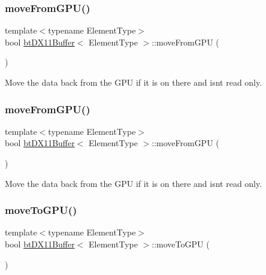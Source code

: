 \subsubsection{\texorpdfstring{move\+From\+G\+P\+U()}{moveFromGPU()}\hspace{0.1cm}{\footnotesize\ttfamily [1/2]}}
{\footnotesize\ttfamily template$<$typename Element\+Type$>$ \\
bool \hyperlink{classbtDX11Buffer}{bt\+D\+X11\+Buffer}$<$ Element\+Type $>$\+::move\+From\+G\+PU (\begin{DoxyParamCaption}{ }\end{DoxyParamCaption})\hspace{0.3cm}{\ttfamily [inline]}}

Move the data back from the G\+PU if it is on there and isn\textquotesingle{}t read only. \mbox{\label{classbtDX11Buffer_aacac21503809131b8991c0cee42e0b1b}} 
\subsubsection{\texorpdfstring{move\+From\+G\+P\+U()}{moveFromGPU()}\hspace{0.1cm}{\footnotesize\ttfamily [2/2]}}
{\footnotesize\ttfamily template$<$typename Element\+Type$>$ \\
bool \hyperlink{classbtDX11Buffer}{bt\+D\+X11\+Buffer}$<$ Element\+Type $>$\+::move\+From\+G\+PU (\begin{DoxyParamCaption}{ }\end{DoxyParamCaption})\hspace{0.3cm}{\ttfamily [inline]}}

Move the data back from the G\+PU if it is on there and isn\textquotesingle{}t read only. \mbox{\label{classbtDX11Buffer_a6d374469254cb3c03d6e18d03ca8a23c}} 
\subsubsection{\texorpdfstring{move\+To\+G\+P\+U()}{moveToGPU()}\hspace{0.1cm}{\footnotesize\ttfamily [1/2]}}
{\footnotesize\ttfamily template$<$typename Element\+Type$>$ \\
bool \hyperlink{classbtDX11Buffer}{bt\+D\+X11\+Buffer}$<$ Element\+Type $>$\+::move\+To\+G\+PU (\begin{DoxyParamCaption}{ }\end{DoxyParamCaption})\hspace{0.3cm}{\ttfamily [inline]}}

